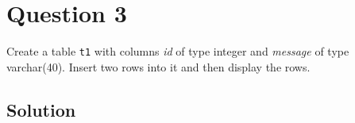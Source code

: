
\section*{Question 3}

Create a table \texttt{t1} with columns \textit{id} of type integer and \textit{message} of type varchar(40).
Insert two rows into it and then display the rows.

\subsection*{Solution}

\lstset{language=sql}

